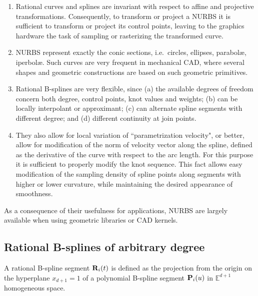 \documentclass[11pt,oneside]{article}	%
\def\E{\mathbb{E}}
\def\v#1{{\bf #1}}
\begin{document}
\begin{enumerate}

\item 
Rational curves and splines are invariant with respect to affine and
projective transformations.  Consequently, to transform or
project a NURBS it is sufficient to transform or project its
control points, leaving to the graphics hardware the task of sampling
or rasterizing the transformed curve.

\item 
NURBS represent exactly the conic sections, i.e.~circles, ellipses, 
parabol\ae, iperbol\ae. Such curves are very frequent in mechanical 
CAD, where several shapes and geometric constructions are based on 
such geometric primitives.

\item
Rational B-splines are very flexible, since (a) the available degrees
of freedom concern both degree, control points, knot values and
weights; (b) can be locally interpolant or approximant; (c) can
alternate spline segments with different degree; and (d)
different continuity at join points.

\item
They also allow for local variation of ``parametrization velocity", or
better, allow for modification of the norm of velocity vector along
the spline, defined as the derivative of the curve with respect to the
arc length.  For this purpose it is sufficient to properly modify the
knot sequence.  This fact allows easy modification of the sampling density
of spline points along segments with higher or lower curvature, while
maintaining the desired appearance of smoothness.

\end{enumerate}

As a consequence of their usefulness for applications, NURBS are
largely available when using geometric libraries or CAD kernels.

\subsection{Rational B-splines of arbitrary degree}

A rational B-spline segment $\v{R}_{i}(t)$ is defined as the
projection from the origin on the hyperplane $x_{d+1}=1$ of a
polynomial B-spline segment $\v{P}_{i}(u)$ in $\E^{d+1}$ homogeneous
space.  
\end{document}

